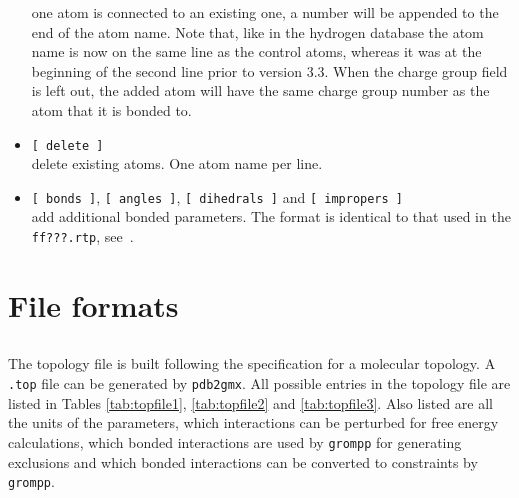 \begin{itemize}
one atom is connected to an existing one, a number will be appended to
the end of the atom name. Note that, like in the hydrogen database the
atom name is now on the same line as the control atoms, whereas it was
at the beginning of the second line prior to {\gromacs} version 3.3.
When the charge group field is left out, the added atom will have
the same charge group number as the atom that it is bonded to.
\item {\tt [~delete~]}\\
delete existing atoms. One atom name per line.
\item {\tt [~bonds~]}, {\tt [~angles~]}, {\tt [~dihedrals~]} and {\tt [~impropers~]}\\
add additional bonded parameters. The format is identical to that used
in the {\tt ff???.rtp}, see~.
\end{itemize}

\section{File formats}
\subsection{}
\label{subsec:topfile}
The topology file is built following the {\gromacs} specification for a
molecular topology.  A {\tt *.top} file can be generated by
{\tt pdb2gmx}.
All possible entries in the topology file are listed in
Tables \ref{tab:topfile1}, \ref{tab:topfile2}  and \ref{tab:topfile3}.
Also listed are all the units
of the parameters, which interactions can be perturbed for free energy
calculations, which bonded interactions are used by {\tt grompp}
for generating exclusions and which bonded interactions can be converted
to constraints by {\tt grompp}.


\newcommand{\tts}{\tt \small}


